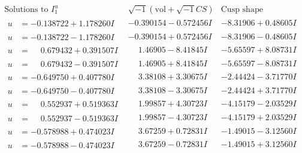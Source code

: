 \documentclass[1p]{elsarticle_modified}
\theoremstyle{definition}
\newcommand{\I}{\sqrt{-1}}
\begin{document}
$$\begin{array}{c|c|c}  
\text{Solutions to }I^u_{1}& \I (\text{vol} + \sqrt{-1}CS) & \text{Cusp shape}\\
 \hline 
\begin{aligned}
u &= -0.138722 + 1.178260 I\end{aligned}
 & -0.390154 - 0.572456 I & -8.31906 + 0.48605 I \\ \hline\begin{aligned}
u &= -0.138722 - 1.178260 I\end{aligned}
 & -0.390154 + 0.572456 I & -8.31906 - 0.48605 I \\ \hline\begin{aligned}
u &= \phantom{-}0.679432 + 0.391507 I\end{aligned}
 & \phantom{-}1.46905 - 8.41845 I & -5.65597 + 8.08731 I \\ \hline\begin{aligned}
u &= \phantom{-}0.679432 - 0.391507 I\end{aligned}
 & \phantom{-}1.46905 + 8.41845 I & -5.65597 - 8.08731 I \\ \hline\begin{aligned}
u &= -0.649750 + 0.407780 I\end{aligned}
 & \phantom{-}3.38108 + 3.30675 I & -2.44424 - 3.71770 I \\ \hline\begin{aligned}
u &= -0.649750 - 0.407780 I\end{aligned}
 & \phantom{-}3.38108 - 3.30675 I & -2.44424 + 3.71770 I \\ \hline\begin{aligned}
u &= \phantom{-}0.552937 + 0.519363 I\end{aligned}
 & \phantom{-}1.99857 + 4.30723 I & -4.15179 - 2.03529 I \\ \hline\begin{aligned}
u &= \phantom{-}0.552937 - 0.519363 I\end{aligned}
 & \phantom{-}1.99857 - 4.30723 I & -4.15179 + 2.03529 I \\ \hline\begin{aligned}
u &= -0.578988 + 0.474023 I\end{aligned}
 & \phantom{-}3.67259 + 0.72831 I & -1.49015 - 3.12560 I \\ \hline\begin{aligned}
u &= -0.578988 - 0.474023 I\end{aligned}
 & \phantom{-}3.67259 - 0.72831 I & -1.49015 + 3.12560 I \\ \hline\begin{aligned}

\end{aligned}
\end{array}$$
\end{document}
